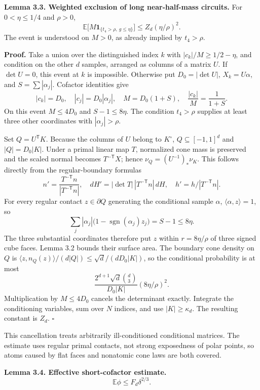 \documentclass[
  11pt,
]{article}
\begin{document}
\textbf{Lemma 3.3. Weighted exclusion of long near-half-mass circuits.}
For \(0<\eta\le1/4\) and \(\rho>0\), \[
 \mathbb E\bigl[M\mathbf1_{\{t_4>\rho,\ g\le\eta\}}\bigr]
 \le Z_d(\eta/\rho)^2.                                        \tag{3.3}
\] The event is understood on \(M>0\), as already implied by
\(t_4>\rho\).

\textbf{Proof.} Take a union over the distinguished index \(k\) with
\(|c_k|/M\ge1/2-\eta\), and condition on the other \(d\) samples,
arranged as columns of a matrix \(U\). If \(\det U=0\), this event at
\(k\) is impossible. Otherwise put \(D_0=|\det U|\), \(X_k=U\alpha\),
and \(S=\sum|\alpha_j|\). Cofactor identities give \[
 |c_k|=D_0,\quad |c_j|=D_0|\alpha_j|,
 \quad M=D_0(1+S),\quad \frac{|c_k|}M=\frac1{1+S}.
\] On this event \(M\le4D_0\) and \(S-1\le8\eta\). The condition
\(t_4>\rho\) supplies at least three other coordinates with
\(|\alpha_j|>\rho\).

Set \(Q=U^{\mathsf T}K\). Because the columns of \(U\) belong to
\(K^\circ\), \(Q\subseteq[-1,1]^d\) and \(|Q|=D_0|K|\). Under a primal
linear map \(T\), normalized cone mass is preserved and the scaled
normal becomes \(T^{-\mathsf T}X\); hence \(\nu_Q=(U^{-1})_*\nu_K\).
This follows directly from the regular-boundary formulas \[
 n'=\frac{T^{-\mathsf T}n}{|T^{-\mathsf T}n|},\quad
 dH'=|\det T|\,|T^{-\mathsf T}n|\,dH,\quad
 h'=h/|T^{-\mathsf T}n|.
\] For every regular contact \(z\in\partial Q\) generating the
conditional sample \(\alpha\), \(\langle\alpha,z\rangle=1\), so \[
 \sum_j|\alpha_j|\bigl(1-\operatorname{sgn}(\alpha_j)z_j\bigr)
 =S-1\le8\eta.
\] The three substantial coordinates therefore put \(z\) within
\(r=8\eta/\rho\) of three signed cube faces. Lemma 3.2 bounds their
surface area. The boundary cone density on \(Q\) is
\(\langle z,n_Q(z)\rangle/(d|Q|)\le\sqrt d/(dD_0|K|)\), so the
conditional probability is at most \[
 \frac{2^{d+1}\sqrt d\binom d3}{D_0|K|}(8\eta/\rho)^2.
\] Multiplication by \(M\le4D_0\) cancels the determinant exactly.
Integrate the conditioning variables, sum over \(N\) indices, and use
\(|K|\ge\kappa_d\). The resulting constant is \(Z_d\). \(\square\)

This cancellation treats arbitrarily ill-conditioned conditional
matrices. The estimate uses regular primal contacts, not strong
exposedness of polar points, so atoms caused by flat faces and nonatomic
cone laws are both covered.

\textbf{Lemma 3.4. Effective short-cofactor estimate.} \[
 \boxed{\mathbb E\phi\le F_d\delta^{2/3}.}                       \tag{3.4}
\]
\end{document}

